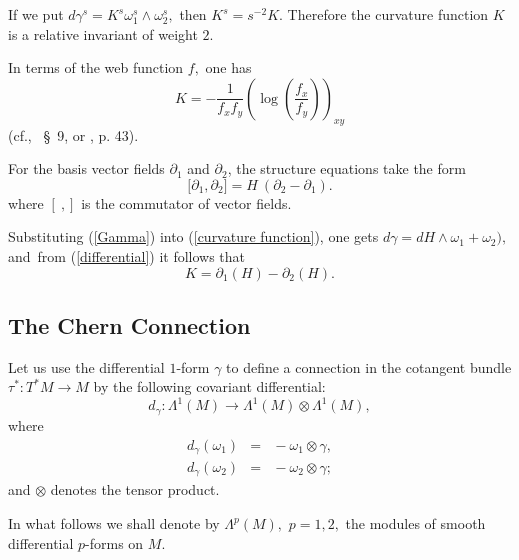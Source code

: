 \documentclass{article}
\begin{document}
If we put $d\gamma ^{s}=K^{s}\omega _{1}^{s}\wedge \omega _{2}^{s},$ then $%
K^{s}=s^{-2}K.$ Therefore the curvature function $K$ is a relative invariant
of weight $2.$

In terms of the web function $f,$ one has
\begin{equation}
K=-\frac{1}{f_{x}f_{y}}\left( \log \left( \frac{f_{x}}{f_{y}}\right) \right)
_{xy}  \label{curvature cheres F}
\end{equation}
(cf.\cite{B 55}, \ \S\ 9, or \cite{AS 92}, p. 43).

For the basis vector fields $\partial _{1}$ and $\partial _{2}$, the
structure equations take the form
\begin{equation}
\lbrack \partial _{1},\partial _{2}]=H~(\partial _{2}-\partial _{1}).
\label{vector structure eq}
\end{equation}%
where $\left[ \ ,\right] $ is the commutator of vector fields.

Substituting (\ref{Gamma}) into (\ref{curvature function}), one gets $%
d\gamma =dH\wedge \omega _{1}+\omega _{2}),$and\ from (\ref{differential})
it follows that
\begin{equation}
K=\partial _{1}\left( H\right) -\partial _{2}\left( H\right) .
\label{curvature main}
\end{equation}

\subsection{The Chern Connection}

Let us use the differential $1$-form $\gamma $ to define a connection in the
cotangent bundle $\tau ^{\ast }:T^{\ast }M\rightarrow M$ by the following
covariant differential:
\begin{equation*}
d_{\gamma }:\Lambda ^{1}\left( M\right) \rightarrow \Lambda ^{1}\left(
M\right) \otimes \Lambda ^{1}\left( M\right) ,
\end{equation*}%
where
\begin{eqnarray*}
d_{\gamma }\left( \omega _{1}\right) &\!\!\!\!=&\!\!\!\!-\omega _{1}\otimes
\gamma , \\
d_{\gamma }\left( \omega _{2}\right) &\!\!\!\!=&\!\!\!\!-\omega _{2}\otimes
\gamma ;
\end{eqnarray*}%
and $\otimes $ denotes the tensor product.

In what follows we shall denote by $\Lambda ^{p}\left( M\right) ,$ $p=1,2,$
the modules of smooth differential $p$-forms on $M.$
\end{document}
